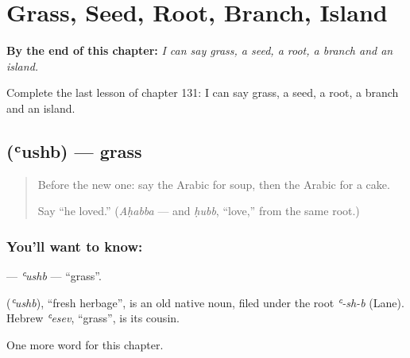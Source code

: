 
\chapter{Grass, Seed, Root, Branch, Island}
\label{ch:ar-grass-seed-root-branch-island}

\begin{chapteropening}
\textbf{By the end of this chapter:} \emph{I can say grass, a seed, a root, a branch and an island.}

Complete the last lesson of chapter 131: I can say grass, a seed, a root, a branch and an island.
\end{chapteropening}

\section[\texorpdfstring{\ar{عشب} (ʿushb)}{عشب (ʿushb)}]{ (ʿushb) — grass}

\label{lesson:AR-C131-ushb}



\begin{quote}
Before the new one: say the Arabic for soup, then the Arabic for a cake.

Say \textquotedblleft{}he loved.\textquotedblright{} (\emph{Aḥabba} — and \emph{ḥubb}, \textquotedblleft{}love,\textquotedblright{} from the same root.)
\end{quote}

\subsection*{You'll want to know: }
\textbf{} — \emph{ʿushb} — \textquotedblleft{}grass\textquotedblright{}.

\begin{cousinweb}
\textbf{} (\emph{ʿushb}), \textquotedblleft{}fresh herbage\textquotedblright{}, is an old native noun, filed under the root \emph{ʿ-sh-b} (Lane). Hebrew \emph{ʿesev}, \textquotedblleft{}grass\textquotedblright{}, is its cousin.
\end{cousinweb}

\begin{grammarlens}[title={What you've built}]
One more word for this chapter.
\end{grammarlens}

